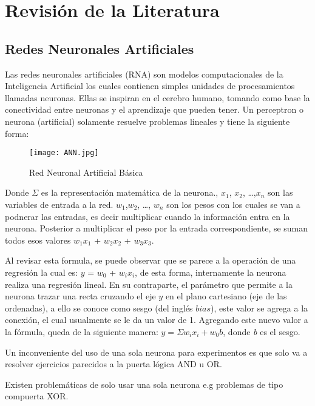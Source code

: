 \chapter{Revisión de la Literatura}
  \section{Redes Neuronales Artificiales}
  
    Las redes neuronales artificiales (RNA) son modelos computacionales de la Inteligencia Artificial los cuales contienen simples unidades de procesamientos llamadas neuronas.  Ellas se inspiran en el cerebro humano, tomando como base la conectividad entre neuronas y el aprendizaje que pueden tener.  Un perceptron o neurona (artificial) solamente resuelve problemas lineales y tiene la siguiente forma:
    
    \begin{figure}[H]
      \centering
      \texttt{[image: ANN.jpg]}
      \caption{Red Neuronal Artificial B\'asica}
      \label{fig:fig1}
    \end{figure}

    Donde $\Sigma$ es la representación matemática de la neurona.,  $x_1$, $x_2$,  \dots  ,$x_n$ son las variables de entrada a la red.  $w_1$,$w_2$,  \dots , $w_n$ son los pesos con los cuales se van a podnerar las entradas, es decir multiplicar cuando la información entra en la neurona. Posterior a multiplicar el peso por la entrada correspondiente,  se suman todos esos valores $w_1$$x_1$ + $w_2$$x_2$ + $w_3$$x_3$.

    Al revisar esta formula, se puede observar que se parece a la operación de una regresión la cual es:  $y$ = $w_0$ + $w_i$$x_i$,  de esta forma, internamente la neurona realiza una regresión lineal. En su contraparte, el parámetro que permite a la neurona trazar una recta cruzando el eje $y$ en el plano cartesiano (eje de las ordenadas), a ello se conoce como sesgo (del inglés $bias$),  este valor se agrega a la conexión, el cual usualmente se le da un valor de 1.
    Agregando este nuevo valor a la fórmula, queda de la siguiente manera: $ y = \Sigma w_i x_i + w_0 b$,  donde \textit{b} es el sesgo.

    Un inconveniente del uso de una sola neurona para experimentos es que solo va a resolver ejercicios parecidos a la puerta lógica AND u OR.
    
    Existen problemáticas de solo usar una sola neurona e.g problemas de tipo compuerta XOR.

